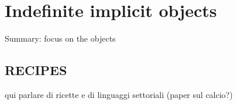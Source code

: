 \setchapterpreamble[u]{\margintoc}
\chapter{Indefinite implicit objects}

Summary: focus on the objects

\section{RECIPES} 

qui parlare di ricette e di linguaggi settoriali (paper sul calcio?)



